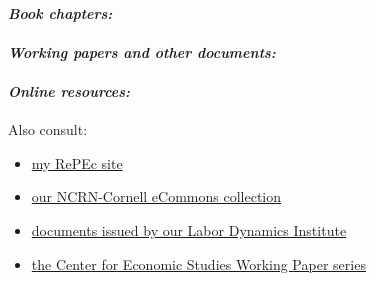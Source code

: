 \documentclass[10pt,letterpaper]{report}
\begin{document}
\paragraph{\it \bf Book chapters:}%
\printbibliography[type=inbook,heading=none]
\paragraph{\it \bf Working papers and other documents:}%
\printbibliography[type=report,heading=none]
\paragraph{\it \bf Online resources:}%
\printbibliography[type=online,heading=none]

Also consult:
\begin{itemize}
	\item \href{http://ideas.repec.org/e/pvi26.html}{my RePEc site}
	\item \href{http://ecommons.library.cornell.edu/handle/1813/30503}{our NCRN-Cornell 
		eCommons collection}
	\item \href{http://www.ilr.cornell.edu/LDI/documents/index.html}{documents issued by our 
		Labor Dynamics Institute}
	\item \href{http://ideas.repec.org/s/cen/wpaper.html}{the Center for Economic Studies Working 
		Paper series}
\end{itemize}

 
\end{document}
